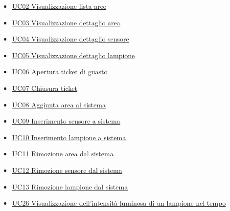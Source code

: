 \begin{itemize}
    \item \hyperref[uc:02]{UC02 Visualizzazione lista aree}
    \item \hyperref[uc:03]{UC03 Visualizzazione dettaglio area}
    \item \hyperref[uc:04]{UC04 Visualizzazione dettaglio sensore}
    \item \hyperref[uc:05]{UC05 Visualizzazione dettaglio lampione}
    \item \hyperref[uc:06]{UC06 Apertura ticket di guasto}
    \item \hyperref[uc:07]{UC07 Chiusura ticket}
    \item \hyperref[uc:08]{UC08 Aggiunta area al sistema}
    \item \hyperref[uc:09]{UC09 Inserimento sensore a sistema}
    \item \hyperref[uc:10]{UC10 Inserimento lampione a sistema}
    \item \hyperref[uc:11]{UC11 Rimozione area dal sistema}
    \item \hyperref[uc:12]{UC12 Rimozione sensore dal sistema}
    \item \hyperref[uc:13]{UC13 Rimozione lampione dal sistema}
    \item \hyperref[uc:26]{UC26 Visualizzazione dell'intensità luminosa di un lampione nel tempo}
\end{itemize}